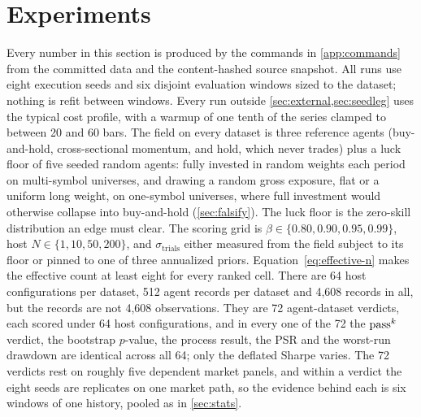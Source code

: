 \section{Experiments}\label{sec:experiments}

Every number in this section is produced by the commands in \cref{app:commands} from the committed data and the content-hashed source snapshot. All runs use eight execution seeds and six disjoint evaluation windows sized to the dataset; nothing is refit between windows. Every run outside \cref{sec:external,sec:seedleg} uses the typical cost profile, with a warmup of one tenth of the series clamped to between 20 and 60 bars. The field on every dataset is three reference agents (buy-and-hold, cross-sectional momentum, and hold, which never trades) plus a luck floor of five seeded random agents: fully invested in random weights each period on multi-symbol universes, and drawing a random gross exposure, flat or a uniform long weight, on one-symbol universes, where full investment would otherwise collapse into buy-and-hold (\cref{sec:falsify}). The luck floor is the zero-skill distribution an edge must clear. The scoring grid is $\beta \in \{0.80, 0.90, 0.95, 0.99\}$, host $N \in \{1, 10, 50, 200\}$, and $\sigma_{\text{trials}}$ either measured from the field subject to its floor or pinned to one of three annualized priors. Equation~\eqref{eq:effective-n} makes the effective count at least eight for every ranked cell. There are 64 host configurations per dataset, 512 agent records per dataset and 4{,}608 records in all, but the records are not 4{,}608 observations. They are 72 agent-dataset verdicts, each scored under 64 host configurations, and in every one of the 72 the $\text{pass}^{k}$ verdict, the bootstrap $p$-value, the process result, the PSR and the worst-run drawdown are identical across all 64; only the deflated Sharpe varies. The 72 verdicts rest on roughly five dependent market panels, and within a verdict the eight seeds are replicates on one market path, so the evidence behind each is six windows of one history, pooled as in \cref{sec:stats}.

